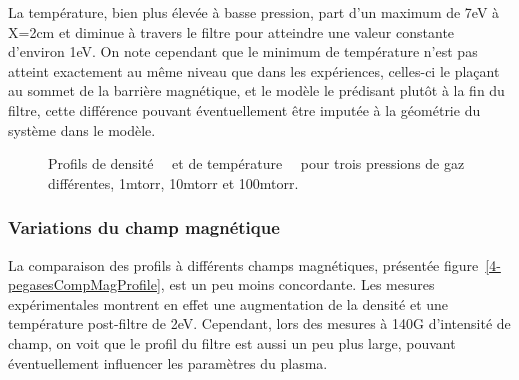 \begin{refsection}
	La température, bien plus élevée à basse pression, part d'un maximum de 7eV à
	X=2cm et diminue à travers le filtre pour atteindre une valeur constante
	d'environ 1eV. On note cependant que le minimum de température n'est pas
	atteint exactement au même niveau que dans les expériences, celles-ci le
	plaçant au sommet de la barrière magnétique, et le modèle le
	prédisant plutôt à la fin du filtre, cette différence pouvant éventuellement
	être imputée à la géométrie du système dans le modèle.

\begin{figure}[!htbp]
  \centering
    \caption{Profils de densité~~ et de
    température~~ pour trois pressions de
    gaz différentes, 1mtorr, 10mtorr et 100mtorr.}
    \label{pegasesCompPressProfils}
\end{figure}

	\subsubsection{Variations du champ magnétique}
	
	La comparaison des profils à différents champs magnétiques, présentée
	figure~\ref{4-pegasesCompMagProfile}, est un peu moins concordante. Les mesures
	expérimentales montrent en effet une augmentation de la densité et une
	température post-filtre de 2eV. Cependant, lors des mesures à 140G
	d'intensité de champ, on voit que le profil du filtre est aussi un peu plus
	large, pouvant éventuellement influencer les paramètres du plasma.
	

\end{refsection}

